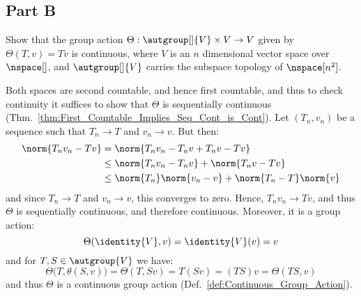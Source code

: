 \documentclass{article}                                                        %
\begin{document}
        \subsection{Part B}
            \begin{problem}
                Show that the group action
                $\Theta:\autgroup[]{V}\times{V}\rightarrow{V}$ given by
                $\Theta(T,v)=Tv$ is continuous, where $V$ is an $n$ dimensional
                vector space over $\nspace[]$, and $\autgroup[]{V}$ carries the
                subspace topology of $\nspace[n^{2}]$.
            \end{problem}
            \begin{solution}
                Both spaces are second countable, and hence first countable, and
                thus to check continuity it suffices to show that $\Theta$ is
                sequentially continuous
                (Thm.~\ref{thm:First_Countable_Implies_Seq_Cont_is_Cont}).
                Let $(T_{n},v_{n})$ be a sequence such that
                $T_{n}\rightarrow{T}$ and $v_{n}\rightarrow{v}$. But then:
                \begin{subequations}
                    \begin{align}
                        \norm{T_{n}v_{n}-Tv}&=\norm{T_{n}v_{n}-T_{n}v+T_{n}v-Tv}\\
                        &\leq\norm{T_{n}v_{n}-T_{n}v}+\norm{T_{n}v-Tv}\\
                        &\leq\norm{T_{n}}\norm{v_{n}-v}+\norm{T_{n}-T}\norm{v}
                    \end{align}
                \end{subequations}
                and since $T_{n}\rightarrow{T}$ and $v_{n}\rightarrow{v}$, this
                converges to zero. Hence, $T_{n}v_{n}\rightarrow{T}v$, and thus
                $\Theta$ is sequentially continuous, and therefore continuous.
                Moreover, it is a group action:
                \begin{equation}
                    \Theta(\identity{V},v)=\identity{V}(v)=v
                \end{equation}
                and for $T,S\in\autgroup{V}$ we have:
                \begin{equation}
                    \Theta\big(T,\theta(S,v)\big)=\Theta(T,Sv)
                    =T(Sv)=(TS)v=\Theta(TS,v)
                \end{equation}
                and thus $\Theta$ is a continuous group action
                (Def.~\ref{def:Continuous_Group_Action}).
            \end{solution}
\end{document}
